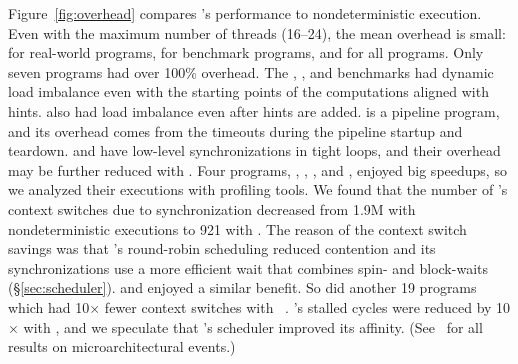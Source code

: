 Figure~\ref{fig:overhead} compares \xxx's performance to nondeterministic
execution.  Even with the maximum number of threads (16--24), the mean
overhead is small: \meanrealoverhead for real-world programs, \meanbenchoverhead for benchmark
programs, and \meanoverhead for all programs.
Only seven programs had over 100\% overhead.  The \ferret, \freqmine, and \is benchmarks
had dynamic load imbalance even with the starting points of the computations
aligned with \compute hints. \ua also had load 
imbalance even after \nondet hints are added.
\xtwosixfour is a pipeline program, and its overhead
comes from the \compute timeouts during the pipeline startup and
teardown.  \rtviewraytrace and \barnes have low-level
synchronizations in tight loops, and their overhead may be further reduced
with \nondets.  Four programs, \mencoder, \bodytrackopenmp, \facesim, and
\linearregrepthread, enjoyed big speedups, so we analyzed their 
executions with profiling tools. We found that the number of \mencoder's 
context switches due to synchronization decreased from 1.9M with
nondeterministic executions to 921 with \xxx.  The reason of the context
switch savings was that \xxx's round-robin scheduling reduced contention
and its synchronizations use a more efficient wait that combines spin- and
block-waits (\S\ref{sec:scheduler}).  \bodytrackopenmp and \facesim
enjoyed a similar benefit.  So did another 19 programs which had
10$\times$ fewer context switches with
\xxx~\cite{Parrot:github}. \linearregrepthread's stalled cycles were
reduced by 10$\times$ with \xxx, and we speculate that \xxx's scheduler
improved its affinity. (See~\cite{Parrot:github} for all results on
microarchitectural events.)





